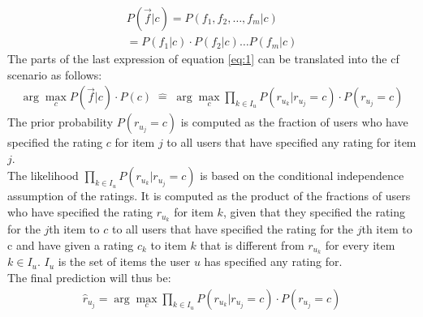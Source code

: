 \begin{equation}
    \begin{align*}
        P(\Vec{f}|c) = P(f_1, f_2,\dots, f_m|c)\\
        = P(f_1|c)\cdot P(f_2|c) \dots P(f_m|c)
    \end{align*}
\end{equation}
The parts of the last expression of equation \eqref{eq:1} can be translated into the \acrshort{cf} scenario as follows:
\begin{equation}
    \begin{align*}
        \arg\max_{c} P(\Vec{f}|c)\cdot P(c) \;\widehat{=}\; \arg\max_{c} \prod\limits_{k \in I_u} P(r_{u_k}|r_{u_j}=c) \cdot P(r_{u_j} = c)
    \end{align*}
\end{equation}
The prior probability $P(r_{u_j} = c)$ is computed as the fraction of users who have specified the rating $c$ for item $j$ to all users that have specified any rating for item $j$.\\
The likelihood $\prod\limits_{k \in I_u} P(r_{u_k}|r_{u_j}=c)$ is based on the conditional independence assumption of the ratings.%
It is computed as the product of the fractions of users who have specified the rating $r_u_k$ for item $k$, given that they specified the rating for the $j$th item to $c$ to all users that have specified the rating for the $j$th item to c and have given a rating $c_k$ to item $k$ that is different from $r_{u_k}$ for every item $k \in I_u$. $I_u$ is the set of items the user $u$ has specified any rating for.\\
The final prediction will thus be:
\begin{equation}
    \begin{align*}
        \hat{r}_{u_j} = \arg\max_{c} \prod\limits_{k \in I_u} P(r_{u_k}|r_{u_j}=c) \cdot P(r_{u_j} = c)
    \end{align*}
\end{equation}

